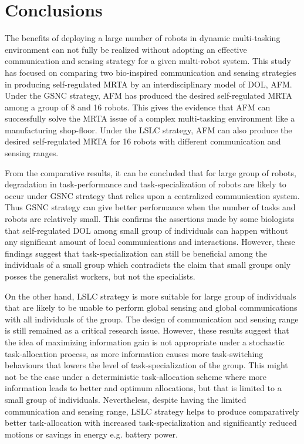 \chapter{Conclusions}
The benefits of deploying a large number of robots in dynamic multi-tasking environment can not fully be realized without adopting an effective communication and sensing strategy for a given multi-robot system. This study has focused on comparing two bio-inspired  communication and sensing strategies in producing self-regulated MRTA by an interdisciplinary model of DOL, AFM. Under the GSNC strategy, AFM has produced the desired self-regulated MRTA among a group of 8 and 16 robots. This gives the evidence that AFM can successfully solve the MRTA issue of a complex multi-tasking environment like a manufacturing shop-floor. Under the LSLC strategy, AFM can also produce the desired self-regulated MRTA for 16 robots with different communication and sensing ranges.

From the comparative results, it can be concluded that for large group of robots,  degradation in  task-performance and task-specialization of robots are likely to occur  under GSNC strategy that relies upon a centralized communication system. Thus GSNC strategy can give better performance when the number of tasks and robots are relatively small. This confirms the assertions made by some biologists that self-regulated DOL among small group of individuals can happen without any significant amount of local communications and interactions. However, these findings suggest that task-specialization can still be beneficial among the individuals of a small group which contradicts the claim that small groups only posses the generalist workers, but not the specialists.

On the other hand, LSLC strategy is more suitable for large group of individuals that are likely to be unable to perform global sensing and global communications with all individuals of the group. The design of communication and sensing range is still remained as a critical research issue. However, these results suggest that the idea of maximizing information gain is not appropriate under a stochastic task-allocation process, as more information causes more task-switching behaviours that lowers the level of task-specialization of the group. This might not be the case under a deterministic task-allocation scheme where more information leads to better and optimum allocations, but that is limited to a small group of individuals. Nevertheless, despite having the limited communication and sensing range, LSLC strategy helps to produce comparatively better task-allocation with increased task-specialization and significantly reduced motions or savings in energy e.g. battery power.

